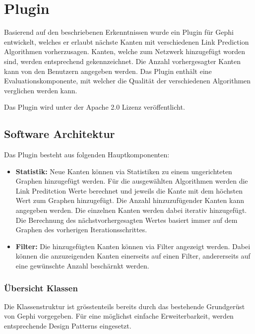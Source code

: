\chapter{Plugin}

Basierend auf den beschriebenen Erkenntnissen wurde ein Plugin für Gephi entwickelt, welches er erlaubt nächste Kanten mit verschiedenen Link Prediction Algorithmen vorherzusagen. Kanten, welche zum Netzwerk hinzugefügt worden sind, werden entsprechend gekennzeichnet. Die Anzahl vorhergesagter Kanten kann von den Benutzern angegeben werden.
Das Plugin enthält eine Evaluationskomponente, mit welcher die Qualität der verschiedenen Algorithmen verglichen werden kann.

Das Plugin wird unter der Apache 2.0 Lizenz veröffentlicht.

\section{Software Architektur}

Das Plugin besteht aus folgenden Hauptkomponenten:

\begin{itemize}
    \item \textbf{Statistik:} Neue Kanten können via Statistiken zu einem ungerichteten Graphen hinzugefügt werden. Für die ausgewählten Algorithmen werden die Link Preditction Werte berechnet und jeweils die Kante mit dem höchsten Wert zum Graphen hinzugefügt. Die Anzahl hinzuzufügender Kanten kann angegeben werden. Die einzelnen Kanten werden dabei iterativ hinzugefügt. Die Berechnung des nächstvorhergesagten Wertes basiert immer auf dem Graphen des vorherigen Iterationsschrittes.
    \item \textbf{Filter:} Die hinzugefügten Kanten können via Filter angezeigt werden. Dabei können die anzuzeigenden Kanten einerseits auf einen Filter, andererseits auf eine gewünschte Anzahl beschärnkt werden.
\end{itemize}

\subsection{Übersicht Klassen}
Die Klassenstruktur ist grösstenteils bereits durch das bestehende Grundgerüst von Gephi vorgegeben. Für eine möglichst einfache Erweiterbarkeit, werden entsprechende Design Patterns eingesetzt.

